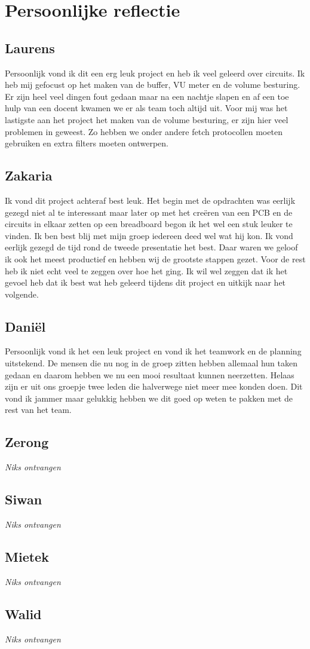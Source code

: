 \section{Persoonlijke reflectie}
\subsection{Laurens}
Persoonlijk vond ik dit een erg leuk project en heb ik veel geleerd over circuits. Ik heb mij gefocust op het maken van de buffer, VU meter en de volume besturing. Er zijn heel veel dingen fout gedaan maar na een nachtje slapen en af een toe hulp van een docent kwamen we er als team toch altijd uit. Voor mij was het lastigste aan het project het maken van de volume besturing, er zijn hier veel problemen in geweest. Zo hebben we onder andere fetch protocollen moeten gebruiken en extra filters moeten ontwerpen.

\subsection{Zakaria}
Ik vond dit project achteraf best leuk. Het begin met de opdrachten was eerlijk gezegd niet al te interessant maar later op met het creëren van een PCB en de circuits in elkaar zetten op een breadboard begon ik het wel een stuk leuker te vinden. Ik ben best blij met mijn groep iedereen deed wel wat hij kon. Ik vond eerlijk gezegd de tijd rond de tweede presentatie het best. Daar waren we geloof ik ook het meest productief en hebben wij de grootste stappen gezet. Voor de rest heb ik niet echt veel te zeggen over hoe het ging. Ik wil wel zeggen dat ik het gevoel heb dat ik best wat heb geleerd tijdens dit project en uitkijk naar het volgende. 

\subsection{Daniël}
Persoonlijk vond ik het een leuk project en vond ik het teamwork en de planning uitstekend. De mensen die nu nog in de groep zitten hebben allemaal hun taken gedaan en daarom hebben we nu een mooi resultaat kunnen neerzetten. Helaas zijn er uit ons groepje twee leden die halverwege niet meer mee konden doen. Dit vond ik jammer maar gelukkig hebben we dit goed op weten te pakken met de rest van het team. 

\subsection{Zerong}
\textit{Niks ontvangen}

\subsection{Siwan}
\textit{Niks ontvangen}

\subsection{Mietek}
\textit{Niks ontvangen}

\subsection{Walid}
\textit{Niks ontvangen}